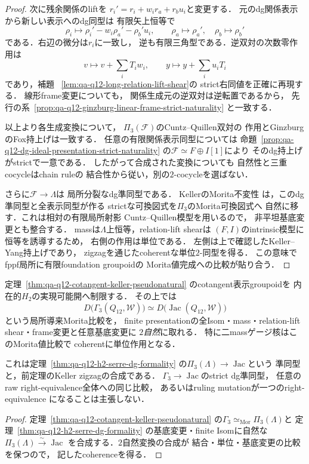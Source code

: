 \begin{proof}
次に残余関係のliftを
$r_i'=r_i+w_i r_a+r_bu_i$と変更する．
元のdg関係表示から新しい表示へのdg同型は
有限矢上恒等で
\[
 \rho_i\longmapsto
 \rho_i'-w_i\rho_a'-\rho_b'u_i,\qquad
 \rho_a\longmapsto\rho_a',\quad
 \rho_b\longmapsto\rho_b'
 \tag{SR}\label{eq:qa-q12-lift-shear-relation-dg-map}
\]
である．右辺の微分は$r_i$に一致し，
逆も有限三角型である．逆双対の次数零作用は
\[
 v\longmapsto v+\sum_iT_iw_i,\qquad
 y\longmapsto y+\sum_i u_iT_i
\]
であり，補題~
\ref{lem:qa-q12-long-relation-lift-shear}の
strict右同値を正確に再現する．
線形frame変更についても，
関係生成元の逆双対は逆転置であるから，
先行の系~\ref{prop:qa-q12-ginzburg-linear-frame-strict-naturality}
と一致する．

以上より各生成変換について，
$\Pi_3(\mathscr F)$のCuntz--Quillen双対の
作用とGinzburgのFox持上げは一致する．
任意の有限関係表示同型については
命題~\ref{prop:qa-q12-dg-ideal-presentation-strict-naturality}
の$\mathscr F\simeq F\oplus I[1]$により
そのdg持上げがstrictで一意である．
したがって合成された変換についても
自然性と三重cocycleはchain ruleの
結合性から従い，別の$2$-cocycleを選ばない．

さらに$\mathscr F\to\Lambda$は
局所分裂なdg準同型である．
KellerのMorita不変性
\cite[Proposition~4.2]{KellerDeformedCY2011}
は，このdg準同型と全表示同型が作る
strictな可換図式を$\Pi_3$のMorita可換図式へ
自然に移す．これは相対の有限局所射影
Cuntz--Quillen模型を用いるので，
非平坦基底変更とも整合する．
massは$\Lambda$上恒等，relation-lift shearは
$(F,I)$のintrinsic模型に恒等を誘導するため，
右側の作用は単位である．
左側は上で確認したKeller--Yang持上げであり，
zigzagを通じたcoherentな単位$2$-同型を得る．
この意味でfppf局所に有限foundation groupoidの
Morita値完成への比較が貼り合う．
\end{proof}

\begin{corollary}
\label{cor:qa-q12-h2-ky-keller-morita-pseudonatural}
定理~\ref{thm:qa-q12-cotangent-keller-pseudonatural}
のcotangent表示groupoidを
内在的$H_2$の実現可能開へ制限する．
その上では
\[
 D\bigl(\Gamma_3(Q_{12},\mathcal W)\bigr)
 \simeq
 D\bigl(\operatorname{Jac}(Q_{12},\mathcal W)\bigr)
 \tag{HJ2}\label{eq:qa-q12-h2-pseudonatural-ginzburg-jacobian}
\]
という局所導来Morita比較を，
finite presentationの全Isom・mass・relation-lift
shear・frame変更と任意基底変更に
\emph{$2$自然}に取れる．
特に二massゲージ核はこのMorita値比較で
coherentに単位作用となる．

これは定理~\ref{thm:qa-q12-h2-serre-dg-formality}
の$\Pi_3(\Lambda)\to\operatorname{Jac}$という
準同型と，前定理のKeller zigzagの合成である．
$\Gamma_3\to\operatorname{Jac}$のstrict dg準同型，
任意のraw right-equivalence全体への同じ比較，
あるいはruling mutationが一つのright-equivalence
になることは主張しない．
\end{corollary}
\begin{proof}
定理~\ref{thm:qa-q12-cotangent-keller-pseudonatural}
の$\Gamma_3\simeq_{\mathrm{Mor}}\Pi_3(\Lambda)$と
定理~\ref{thm:qa-q12-h2-serre-dg-formality}
の基底変更・finite Isomに自然な
$\Pi_3(\Lambda)\xrightarrow{\sim}\operatorname{Jac}$
を合成する．$2$自然変換の合成が
結合・単位・基底変更の比較を保つので，
記したcoherenceを得る．
\end{proof}

